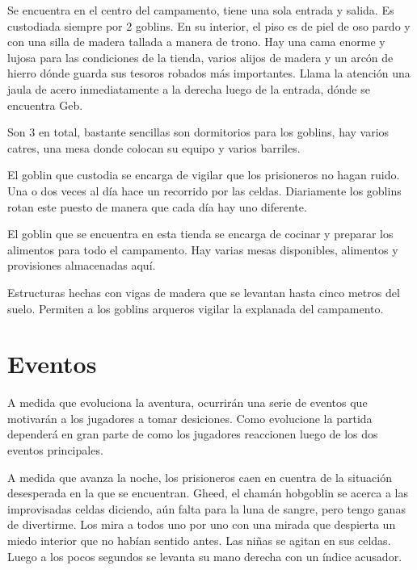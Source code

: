 \documentclass[10pt,twoside,twocolumn,openany]{dndbook}
\begin{document}
Se encuentra en el centro del campamento, tiene una sola entrada y salida. Es custodiada siempre por 2 goblins. En su interior, el piso es de piel de oso pardo y con una silla de madera tallada a manera de trono. Hay una cama enorme y lujosa para las condiciones de la tienda, varios alijos de madera y un arcón de hierro dónde guarda sus tesoros robados más importantes. Llama la atención una jaula de acero inmediatamente a la derecha luego de la entrada, dónde se encuentra Geb.

Son 3 en total, bastante sencillas son dormitorios para los goblins, hay varios catres, una mesa donde colocan su equipo y varios barriles.

El goblin que custodia se encarga de vigilar que los prisioneros no hagan ruido. Una o dos veces al día hace un recorrido por las celdas. Diariamente los goblins rotan este puesto de manera que cada día hay uno diferente.

El goblin que se encuentra en esta tienda se encarga de cocinar y preparar los alimentos para todo el campamento. Hay varias mesas disponibles, alimentos y provisiones almacenadas aquí.

Estructuras hechas con vigas de madera que se levantan hasta cinco metros del suelo. Permiten a los goblins arqueros vigilar la explanada del campamento.

\section{Eventos}
A medida que evoluciona la aventura, ocurrirán una serie de eventos que motivarán a los jugadores a tomar desiciones. Como evolucione la partida dependerá en gran parte de como los jugadores reaccionen luego de los dos eventos principales.

\begin{DndReadAloud}
  A medida que avanza la noche, los prisioneros caen en cuentra de la situación desesperada en la que se encuentran. Gheed, el chamán hobgoblin se acerca a las improvisadas celdas diciendo, aún falta para la luna de sangre, pero tengo ganas de divertirme. Los mira a todos uno por uno con una mirada que despierta un miedo interior que no habían sentido antes. Las niñas se agitan en sus celdas. Luego a los pocos segundos se levanta su mano derecha con un índice acusador.
\end{DndReadAloud}
\end{document}
